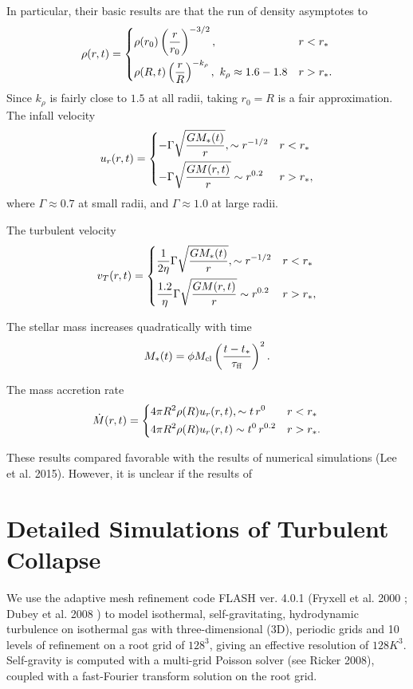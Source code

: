 \documentclass{emulateapj}
\newcommand{\be}{\begin{equation}}
\newcommand{\ee}{\end{equation}}
\newcommand       \etaeff       {\eta}
\newcommand       \tff          {\tau_{\rm ff}}
\begin{document}
In particular, their basic results are that the run of density asymptotes to 
\be
\rho(r,t)=
\begin{dcases}
\rho(r_0)\left({r\over r_0}\right)^{-3/2}, & r<r_*\\
\rho(R,t)\left({r\over R}\right)^{-k_\rho}, \ k_\rho\approx1.6-1.8 & r>r_*.
\end{dcases}
\ee
Since $k_\rho$ is fairly close to $1.5$ at all radii, taking $r_0=R$
is a fair approximation. 
The infall velocity 
%
\be
u_r(r,t)=
\begin{dcases}
-\Gamma\sqrt{GM_*(t)\over r}, \sim r^{-1/2} & r<r_*\\
-\Gamma\sqrt{GM(r,t)\over r} \sim r^{0.2} & r>r_*,
\end{dcases}
\ee
%
where $\Gamma \approx 0.7$ at small radii, and $\Gamma\approx 1.0$ at
large radii. 

The turbulent velocity 
%
\be
v_T(r,t)=
\begin{dcases}
{1\over 2\etaeff}\Gamma\sqrt{GM_*(t)\over r}, \sim r^{-1/2} & r<r_*\\
{1.2\over \etaeff}\Gamma\sqrt{GM(r,t)\over r} \sim r^{0.2} & r>r_*,
\end{dcases}
\ee
%

The stellar mass increases quadratically with time
%
\be  %
M_*(t)=\phi M_{\rm cl}\left({t-t_*\over \tff}\right)^2.
\ee  %
%

The mass accretion rate 
%
\be
\dot M(r,t)=
\begin{dcases}
4\pi R^2\rho(R)u_r(r,t), \sim t\,r^{0} & r<r_*\\
4\pi R^2\rho(R)u_r(r,t) \sim t^0\,r^{0.2} & r>r_*.
\end{dcases}
\ee
%

These results compared favorable with the results of numerical simulations (Lee et al. 2015).  However, it is unclear if the results of 

\section{Detailed Simulations of Turbulent Collapse}

We use the adaptive mesh refinement code FLASH ver. 4.0.1 (Fryxell et al.
2000
; Dubey
et al.
2008
) to model isothermal, self-gravitating, hydrodynamic turbulence on isothermal gas with three-dimensional (3D),
periodic grids and 10 levels of refinement on a root grid of $128^3$, giving an effective resolution of $128K^3$.  
Self-gravity is computed with a multi-grid Poisson solver (see Ricker
2008), coupled with a fast-Fourier transform solution on the root grid.
\end{document}
